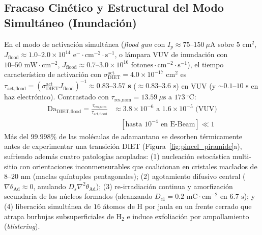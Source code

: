 \documentclass[10pt,twocolumn,a4paper]{article}
\begin{document}
\subsection{Fracaso Cinético y Estructural del Modo Simultáneo (Inundación)}
En el modo de activación simultánea (\textit{flood gun} con $I_p \approx 75\text{--}150\ \mu\text{A}$ sobre $5\text{ cm}^2$, $J_{\text{flood}} \approx 1.0\text{--}2.0 \times 10^{14}\text{ e}^-\cdot\text{cm}^{-2}\cdot\text{s}^{-1}$, o lámpara VUV de inundación con $10\text{--}50\text{ mW}\cdot\text{cm}^{-2}$, $J_{\text{flood}} \approx 0.7\text{--}3.0 \times 10^{16}\text{ fotones}\cdot\text{cm}^{-2}\cdot\text{s}^{-1}$), el tiempo característico de activación con $\sigma_{\text{DIET}}^{\text{act}} = 4.0 \times 10^{-17}\text{ cm}^2$ es $\tau_{\text{act,flood}} = (\sigma_{\text{DIET}}^{\text{act}} J_{\text{flood}})^{-1} \approx \mathbf{0.83\text{--}3.57\text{ s}}$ ($\approx 0.83\text{--}3.6\text{ s}$) en VUV (y $\sim 0.1\text{--}10\text{ s}$ en haz electrónico). Contrastado con $\tau_{\text{res,nom}} = 13.59\ \mu\text{s}$ a $173\ ^\circ\text{C}$:
\begin{equation}
\begin{split}
\text{Da}_{\text{DIET,flood}} = \frac{\tau_{\text{res,nom}}}{\tau_{\text{act,flood}}} &\approx 3.8 \times 10^{-6}\text{ a }1.6 \times 10^{-5}\text{ (VUV)} \\
&\quad \left[\text{hasta }10^{-4}\text{ en E-Beam}\right] \ll 1
\end{split}
\end{equation}
Más del $\mathbf{99.998\%}$ de las moléculas de adamantano se desorben térmicamente antes de experimentar una transición DIET (Figura~\ref{fig:pincel_piramide}a), sufriendo además cuatro patologías acopladas: (1) nucleación estocástica multi-sitio con orientaciones inconmensurables que coalicionan en cristales maclados de $8\text{--}20\text{ nm}$ (maclas quíntuples pentagonales); (2) agotamiento difusivo central ($\nabla\theta_{\text{Ad}} \approx 0$, anulando $D_s \nabla^2 \theta_{\text{Ad}}$); (3) re-irradiación continua y amorfización secundaria de los núcleos formados (alcanzando $D_{c1} = 0.2\text{ mC}\cdot\text{cm}^{-2}$ en $6.7\text{ s}$); y (4) liberación simultánea de $16$ átomos de $\text{H}$ por jaula en un frente cerrado que atrapa burbujas subsuperficiales de $\text{H}_2$ e induce exfoliación por ampollamiento (\textit{blistering}).
\end{document}

